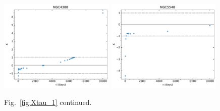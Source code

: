 \begin{figure}
\begin{center}
{  \includegraphics[width=0.49\textwidth]{Figs/Chapter5/X_tau/X_tau_NGC4388.pdf} 
  \includegraphics[width=0.49\textwidth]{Figs/Chapter5/X_tau/X_tau_NGC5548.pdf} \hfill 
  \caption{Fig.~\ref{fig:Xtau_1} continued.}
    \label{fig:Xtau_5}
  }
\end{center}
\end{figure}

